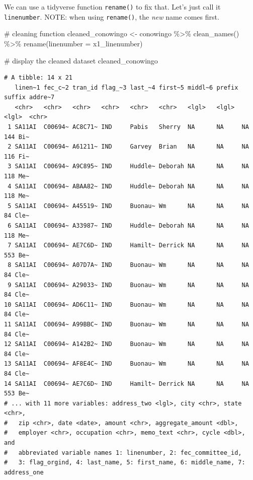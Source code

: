 \documentclass[
  letterpaper,
  DIV=11,
  numbers=noendperiod]{scrreprt}
\newenvironment{Shaded}{\begin{snugshade}}{\end{snugshade}}
\newcommand{\AttributeTok}[1]{\textcolor[rgb]{0.40,0.45,0.13}{#1}}
\newcommand{\CommentTok}[1]{\textcolor[rgb]{0.37,0.37,0.37}{#1}}
\newcommand{\FunctionTok}[1]{\textcolor[rgb]{0.28,0.35,0.67}{#1}}
\newcommand{\NormalTok}[1]{\textcolor[rgb]{0.00,0.23,0.31}{#1}}
\newcommand{\OtherTok}[1]{\textcolor[rgb]{0.00,0.23,0.31}{#1}}
\newcommand{\SpecialCharTok}[1]{\textcolor[rgb]{0.37,0.37,0.37}{#1}}
\begin{document}
We can use a tidyverse function \texttt{rename()} to fix that. Let's
just call it \texttt{linenumber}. NOTE: when using \texttt{rename()},
the \emph{new} name comes first.

\begin{Shaded}
\begin{Highlighting}[]
\CommentTok{\# cleaning function}
\NormalTok{cleaned\_conowingo }\OtherTok{\textless{}{-}}\NormalTok{ conowingo }\SpecialCharTok{\%\textgreater{}\%}
  \FunctionTok{clean\_names}\NormalTok{() }\SpecialCharTok{\%\textgreater{}\%}
  \FunctionTok{rename}\NormalTok{(}\AttributeTok{linenumber =}\NormalTok{ x1\_linenumber)}

\CommentTok{\# display the cleaned dataset}
\NormalTok{cleaned\_conowingo}
\end{Highlighting}
\end{Shaded}

\begin{verbatim}
# A tibble: 14 x 21
   linen~1 fec_c~2 tran_id flag_~3 last_~4 first~5 middl~6 prefix suffix addre~7
   <chr>   <chr>   <chr>   <chr>   <chr>   <chr>   <lgl>   <lgl>  <lgl>  <chr>  
 1 SA11AI  C00694~ AC8C71~ IND     Pabis   Sherry  NA      NA     NA     144 Bi~
 2 SA11AI  C00694~ A61211~ IND     Garvey  Brian   NA      NA     NA     116 Fi~
 3 SA11AI  C00694~ A9C895~ IND     Huddle~ Deborah NA      NA     NA     118 Me~
 4 SA11AI  C00694~ ABAA82~ IND     Huddle~ Deborah NA      NA     NA     118 Me~
 5 SA11AI  C00694~ A45519~ IND     Buonau~ Wm      NA      NA     NA     84 Cle~
 6 SA11AI  C00694~ A33987~ IND     Huddle~ Deborah NA      NA     NA     118 Me~
 7 SA11AI  C00694~ AE7C6D~ IND     Hamilt~ Derrick NA      NA     NA     553 Be~
 8 SA11AI  C00694~ A07D7A~ IND     Buonau~ Wm      NA      NA     NA     84 Cle~
 9 SA11AI  C00694~ A29033~ IND     Buonau~ Wm      NA      NA     NA     84 Cle~
10 SA11AI  C00694~ AD6C11~ IND     Buonau~ Wm      NA      NA     NA     84 Cle~
11 SA11AI  C00694~ A99BBC~ IND     Buonau~ Wm      NA      NA     NA     84 Cle~
12 SA11AI  C00694~ A142B2~ IND     Buonau~ Wm      NA      NA     NA     84 Cle~
13 SA11AI  C00694~ AF8E4C~ IND     Buonau~ Wm      NA      NA     NA     84 Cle~
14 SA11AI  C00694~ AE7C6D~ IND     Hamilt~ Derrick NA      NA     NA     553 Be~
# ... with 11 more variables: address_two <lgl>, city <chr>, state <chr>,
#   zip <chr>, date <date>, amount <chr>, aggregate_amount <dbl>,
#   employer <chr>, occupation <chr>, memo_text <chr>, cycle <dbl>, and
#   abbreviated variable names 1: linenumber, 2: fec_committee_id,
#   3: flag_orgind, 4: last_name, 5: first_name, 6: middle_name, 7: address_one
\end{verbatim}
\end{document}
